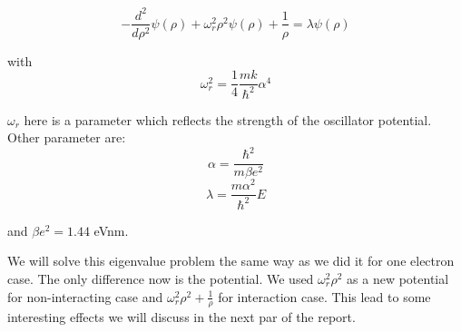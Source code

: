 \documentclass[10pt]{article}
\begin{document}
	\begin{equation}
		-\frac{d^{2}}{d\rho ^{2}}\psi (\rho )+\omega _{r}^{2}\rho ^{2}\psi (\rho )+%
		\frac{1}{\rho }=\lambda \psi (\rho )
	\end{equation}
	
	with 
	\begin{equation}
		\omega _{r}^{2}=\frac{1}{4}\frac{mk}{\hbar ^{2}}\alpha ^{4}
	\end{equation}
	
	$\omega _{r}$ here is a parameter which reflects the strength of the
	oscillator potential. Other parameter are:%
	\begin{equation}
		\alpha =\frac{\hbar ^{2}}{m\beta e^{2}}
	\end{equation}%
	\begin{equation}
		\lambda =\frac{m\alpha ^{2}}{\hbar ^{2}}E
	\end{equation}
	
	and $\beta e^{2}=1.44$ eVnm.
	
We will solve this eigenvalue problem the same way as we did it for one
electron case. The only difference now is the potential. We used $\omega _{r}^{2}\rho ^{2} $ as a new potential for non-interacting case and  $\omega _{r}^{2}\rho ^{2}+\frac{1}{\rho }$ for interaction case. This lead to some interesting effects we will discuss in the next par of the report.

\newpage
\end{document}
